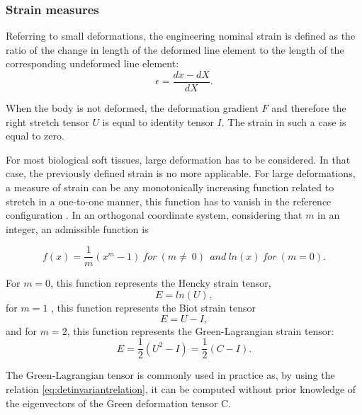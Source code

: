\subsubsection*{Strain measures}\label{strainmeasure}
Referring to small deformations, the engineering nominal strain is defined as the ratio of the change in length of the deformed line element to the length of the corresponding undeformed line element:  
\begin{equation}
\epsilon = \frac{ dx  - dX }{	dX }.
\end{equation}

When the body is not deformed, the deformation gradient $F$ and therefore the right stretch tensor $U$ is equal to identity tensor $I$. The strain in such a case is equal to zero. 

For most biological soft tissues, large deformation has to be considered. In that case, the previously defined strain is no more applicable. For large deformations, a measure of strain can be any monotonically increasing function related to stretch in a one-to-one manner, this function has to vanish in the reference configuration \citep{mcmeeking_finite_1975}. In an orthogonal coordinate system, considering that $m$ in an integer, an admissible function is  

\begin{equation}
f(x) = \frac{1}{m}(x^m-1) \ for \ (m \ne\ 0)\  \ and \ ln(x) \ for \ (m=0).
\end{equation}


For $m = 0$, this function represents the Hencky strain tensor, 
\begin{equation}
E = ln(U), 
\end{equation}
for $m=1$ , this function represents the Biot strain tensor 
\begin{equation}
E = U-I,
\end{equation}
and for $m=2$, this function represents the Green-Lagrangian strain tensor:
\begin{equation}
E = \frac{1}{2}(U^2-I) =  \frac{1}{2}(C-I).
\end{equation}

The Green-Lagrangian tensor is commonly used in practice as, by using the relation \ref{eq:detinvariantrelation}, it can be computed without prior knowledge of the eigenvectors of the Green deformation tensor C.
%

